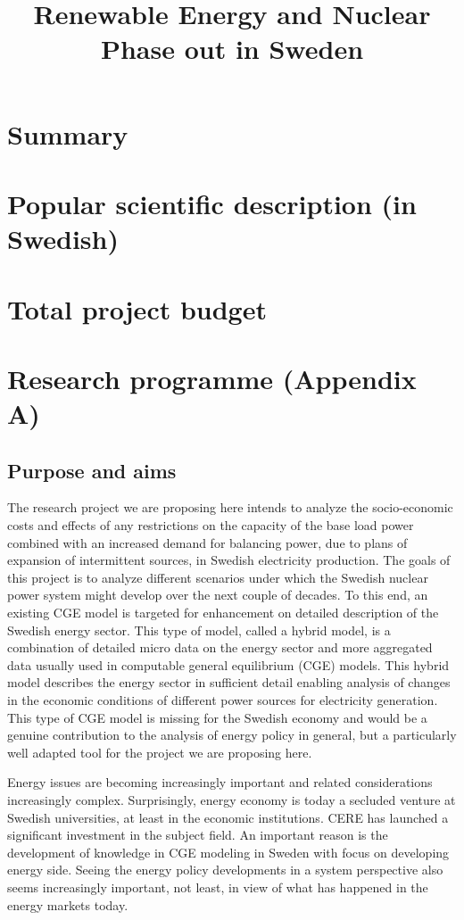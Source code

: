 \documentclass[10pt,a4paper]{article}
\begin{document}
\title{Renewable Energy and Nuclear Phase out in Sweden}
\date{}
\author{}
\maketitle

\section{Summary}
\section{Popular scientific description (in Swedish)}
\section{Total project budget}

\section{Research programme (Appendix A)}
\subsection{Purpose and aims}
The research project we are proposing here intends to analyze the socio-economic costs and effects of any restrictions on the capacity of the base load power combined with an increased demand for balancing power, due to plans of expansion of intermittent sources, in Swedish electricity production. The goals of this project is to analyze different scenarios under which the Swedish nuclear power system might develop over the next couple of decades. To this end, an existing CGE model is targeted for enhancement on detailed description of the Swedish energy sector. This type of model, called a hybrid model, is a combination of detailed micro data on the energy sector and more aggregated data usually used in computable general equilibrium (CGE) models. This hybrid model describes the energy sector in sufficient detail enabling analysis of changes in the economic conditions of different power sources for electricity generation. This type of CGE model is missing for the Swedish economy and would be a genuine contribution to the analysis of energy policy in general, but a particularly well adapted tool for the project we are proposing here.

Energy issues are becoming increasingly important and related considerations increasingly complex. Surprisingly, energy economy is today a secluded venture at Swedish universities, at least in the economic institutions. CERE has launched a significant investment in the subject field. An important reason is the development of knowledge in CGE modeling in Sweden with focus on developing energy side. Seeing the energy policy developments in a system perspective also seems increasingly important, not least, in view of what has happened in the energy markets today.
\end{document}

